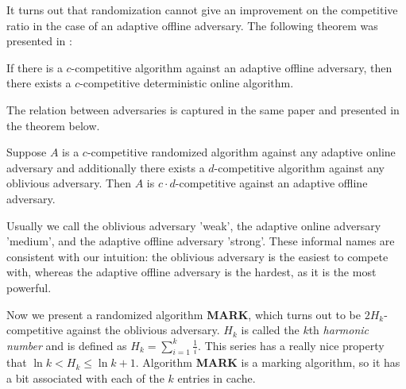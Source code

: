 It turns out that randomization cannot give an improvement on the competitive 
ratio in the case of an adaptive offline adversary. The following theorem was 
presented in \cite{power}:
\begin{theorem}
If there is a $c$-competitive algorithm against an adaptive offline adversary, then 
there exists a $c$-competitive deterministic online algorithm. 
\end{theorem}
The relation between adversaries is captured in the same paper and presented in the 
theorem below.
\begin{theorem}
Suppose $A$ is a $c$-competitive randomized algorithm against any adaptive online 
adversary and additionally there exists a $d$-competitive algorithm against any 
oblivious adversary. Then $A$ is $c \cdot d$-competitive against an adaptive 
offline adversary.
\end{theorem}
Usually we call the oblivious adversary 'weak', the adaptive online adversary 'medium', and 
the adaptive offline adversary 'strong'. These informal names are consistent with our intuition: 
the oblivious adversary is the easiest to compete with, whereas the adaptive offline adversary is 
the hardest, as it is the most powerful.

Now we present a randomized algorithm \textbf{MARK}, which turns out to be 
$2H_k$-competitive against the oblivious adversary. $H_k$ is called the $k$th 
\textit{harmonic number} and is defined as $H_k = \sum^k_{i=1} \frac{1}{i}$. 
This series has a really nice property that $\ln k < H_k \leq \ln k + 1$. 
Algorithm \textbf{MARK} is a marking algorithm, so it has a bit associated with 
each of the $k$ entries in cache.

